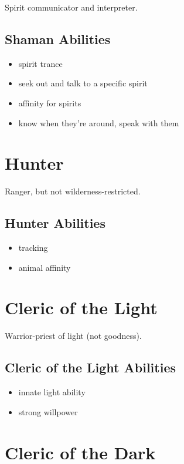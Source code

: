 \begin{multicols}{2}
Spirit communicator and interpreter.

\subsection{Shaman Abilities}

\begin{itemize}
    \item spirit trance   \item seek out and talk to a specific spirit
    \item affinity for spirits    \item know when they're around, speak with them
\end{itemize}

\section{Hunter}

Ranger, but not wilderness-restricted.

\subsection{Hunter Abilities}

\begin{itemize}
    \item tracking
    \item animal affinity
\end{itemize}

\section{Cleric of the Light}

Warrior-priest of light (not goodness).

\subsection{Cleric of the Light Abilities}

\begin{itemize}
    \item innate light ability
    \item strong willpower
\end{itemize}

\section{Cleric of the Dark}


\end{multicols}
